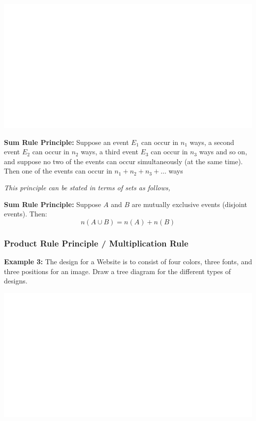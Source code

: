 \documentclass[]{book}
\begin{document}
\begin{center}\includegraphics[width=1\linewidth]{figure/box82-1} \end{center}

\textbf{Sum Rule Principle:} Suppose an event \(E_1\) can occur in \(n_1\) ways, a second event \(E_2\) can occur in \(n_2\) ways, a third event \(E_3\) can occur in \(n_3\) ways and so on, and suppose no two of the events can occur simultaneously (at the same time). Then one of the events can occur in \(n_1 + n_2 + n_3 + \dots\) ways

\emph{This principle can be stated in terms of sets as follows,}

\textbf{Sum Rule Principle:} Suppose \(A\) and \(B\) are mutually exclusive events (disjoint events). Then: \[n(A \cup B)   = n(A) + n(B)\]

\hypertarget{product-rule-principle-multiplication-rule}{%
\subsubsection{Product Rule Principle / Multiplication Rule}\label{product-rule-principle-multiplication-rule}}

\textbf{Example 3:} The design for a Website is to consist of four colors, three fonts, and three positions for an image. Draw a tree diagram for the different types of designs.

\begin{center}\includegraphics[width=1\linewidth]{figure/box83-1} \end{center}
\end{document}
